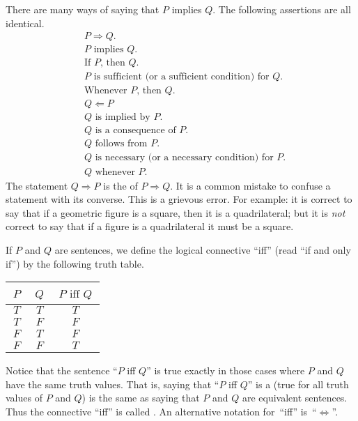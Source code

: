 There are many ways of saying that $P$ implies $Q$. The following assertions are all identical.
\begin{align*}
  &P \Rightarrow Q. \\
  &\text{$P$ implies $Q$.} \\
  &\text{If $P$, then $Q$.} \\
  &\text{$P$ is sufficient (or a sufficient condition) for $Q$.}\\
  &\text{Whenever $P$, then $Q$.} \\
  &Q \Leftarrow P \\
  &\text{$Q$ is implied by $P$.} \\
  &\text{$Q$ is a consequence of $P$.} \\
  &\text{$Q$ follows from $P$.} \\
  &\text{$Q$ is necessary (or a necessary condition) for $P$.} \\
  &\text{$Q$ whenever $P$.}
\end{align*}
The statement $Q \Rightarrow P$ is the
 of $P \Rightarrow Q$. It is a common mistake to confuse a statement with its
converse. This is a grievous error. For example: it is correct to say that if a geometric
figure is a square, then it is a quadrilateral; but it is \emph{not} correct to say that if a
figure is a quadrilateral it must be a square.

\begin{defn} If $P$ and $Q$ are sentences, we define the logical connective ``iff'' (read
``if and only if'') by the following truth table.


 \begin{center}
  \begin{tabular}{|c|c||c|}\hline
        \,$P$\,    &    \,$Q$\,    &   \,$P \text{ iff } Q$\,   \\
    \hline\hline
          $T$      &      $T$      &     $T$            \\
    \hline
          $T$      &      $F$      &     $F$            \\
    \hline
          $F$      &      $T$      &     $F$            \\
    \hline
          $F$      &      $F$      &     $T$            \\
    \hline
  \end{tabular}
 \end{center}
Notice that the sentence ``$P$ iff $Q$'' is true exactly in those cases where $P$ and $Q$ have
the same truth values. That is, saying that ``$P$ iff $Q$'' is a
 (true for all truth values of $P$ and $Q$) is the same as saying that $P$ and
$Q$ are equivalent sentences.  Thus the connective ``iff'' is called
. An alternative notation
for~``iff''
is~``$\Leftrightarrow$''.
\end{defn}

